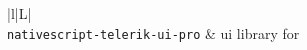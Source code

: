 \begin{longtabu*}{|l|L|}
 \\ 
\hline
\verb+nativescript-telerik-ui-pro+ & \Gls{ui} library for  \\
\end{longtabu*}


